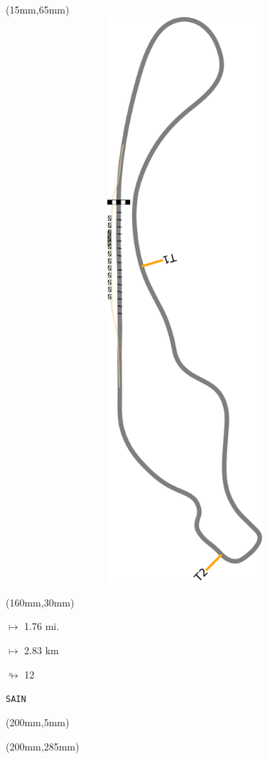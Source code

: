 \begin{textblock*}{185mm}(15mm,65mm)%
\centering
\mbox{\includegraphics[width=185mm,height=210mm,keepaspectratio]{PT/SAIN.pdf}}
\end{textblock*}
\begin{textblock*}{40mm}(160mm,30mm)%
\Large
\par$\mapsto$ 1.76 mi.
\par$\mapsto$ 2.83 km
\par$\looparrowright$ 12
\par\hfill\tiny\tt SAIN\\
\end{textblock*}
\begin{textblock*}{20mm}(200mm,5mm)%
\fbox{\thepage}
\label{SAIN}
\end{textblock*}
\begin{textblock*}{20mm}(200mm,285mm)%
\fbox{\thepage}
\end{textblock*}


